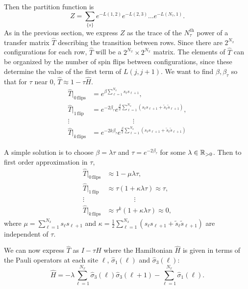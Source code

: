 \documentclass[10pt,reqno]{amsart}
\begin{document}
	Then the partition function is 
	\[ Z=\sum_{\{s\}} e^{-L(1,2)}e^{-L(2,3)}\ldots e^{-L(N_\tau,1)}. \]
	As in the previous section, we express $Z$ as the trace of the $N_\tau^\text{th}$ power of a transfer matrix $\hat{T}$ describing the transition between rows. 
	Since there are $2^{N_x}$ configurations for each row, $\hat{T}$ will be a $2^{N_x}\times 2^{N_x}$ matrix.
	The elements of $\hat{T}$ can be organized by the number of spin flips between configurations, since these determine the value of the first term of $L(j,j+1)$. We want to find $\beta,\beta_\tau$ so that for $\tau$ near 0, $\hat{T} \approx 1 - \tau \hat{H}$.
	\begin{align*}
		\hat{T}|_{0\,\text{flips}} &= e^{\beta \sum_{\ell=1}^{N_x} s_{\ell} s_{\ell+1}},  \\		
		\hat{T}|_{1\,\text{flip}} &= e^{-2\beta_\tau} e^{\frac{\beta}{2}\sum_{\ell=1}^{N_x}(s_\ell s_{\ell+1}+\tilde{s}_\ell \tilde{s}_{\ell+1})},\\
		\vdots \quad & \qquad\qquad\qquad \vdots \\		
		\hat{T}|_{k\,\text{flips}} &= e^{-2k\beta_\tau} e^{\frac{\beta}{2}\sum_{\ell=1}^{N_x}(s_\ell s_{\ell+1}+\tilde{s}_\ell \tilde{s}_{\ell+1})}		
	\end{align*}
	
	A simple solution is to choose $\beta =\lambda \tau$ and $\tau = e^{-2\beta_\tau}$ for some $\lambda \in \mathbb{R}_{>0}$.
	Then to first order approximation in $\tau$,
	\begin{align*}
		\hat{T}|_{0\,\text{flips}} &\approx 1-\mu\lambda\tau, \\
		\hat{T}|_{1\,\text{flip}} &\approx \tau (1+\kappa \lambda\tau) \approx \tau, \\
		\vdots \quad & \qquad\qquad \vdots \\		
		\hat{T}|_{k\,\text{flips}} &\approx \tau^k (1+\kappa \lambda\tau) \approx 0, 
	\end{align*}
    where $\mu=\sum_{\ell=1}^{N_x}s_{\ell}s_{\ell+1}$ and $\kappa=\frac{1}{2}\sum_{\ell=1}^{N_x} (s_{\ell}s_{\ell+1}+\tilde{s}_{\ell}\tilde{s}_{\ell+1})$ are independent of $\tau$.
    
    We can now express $\hat{T}$ as $I- \tau \hat{H}$ where the Hamiltonian $\hat{H}$ is given in terms of the Pauli operators at each site $\ell$, $\hat{\sigma}_1(\ell)$ and $\hat{\sigma}_3(\ell)$:
    \begin{equation}\label{eq:1+1IsingHamiltonian}
    \hat{H}= -\lambda \sum_{\ell=1}^{N_x} \hat{\sigma}_3(\ell)\hat{\sigma}_3(\ell+1) - \sum_{\ell=1}^{N_x} \hat{\sigma}_1(\ell). 
    \end{equation}
    
\end{document}
